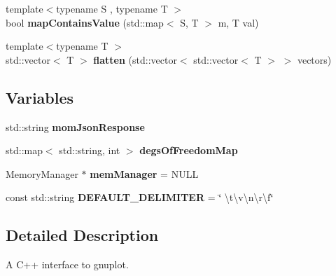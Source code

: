 \begin{DoxyCompactItemize}
\item 
{\footnotesize template$<$typename S , typename T $>$ }\\bool {\bfseries map\+Contains\+Value} (std\+::map$<$ S, T $>$ m, T val)\hypertarget{namespacekukadu_a31ae41f2729ca2c2be7f85acc9a875c1}{}\label{namespacekukadu_a31ae41f2729ca2c2be7f85acc9a875c1}

\item 
{\footnotesize template$<$typename T $>$ }\\std\+::vector$<$ T $>$ {\bfseries flatten} (std\+::vector$<$ std\+::vector$<$ T $>$ $>$ vectors)\hypertarget{namespacekukadu_a33dc3d9bd4c770753d96ce9abbab107e}{}\label{namespacekukadu_a33dc3d9bd4c770753d96ce9abbab107e}

\end{DoxyCompactItemize}
\subsection*{Variables}
\begin{DoxyCompactItemize}
\item 
std\+::string {\bfseries mom\+Json\+Response}\hypertarget{namespacekukadu_abb61c4204f8db773c0c983bf215313c0}{}\label{namespacekukadu_abb61c4204f8db773c0c983bf215313c0}

\item 
std\+::map$<$ std\+::string, int $>$ {\bfseries degs\+Of\+Freedom\+Map}\hypertarget{namespacekukadu_a74c6551366c28524eb14f644f9c80efd}{}\label{namespacekukadu_a74c6551366c28524eb14f644f9c80efd}

\item 
Memory\+Manager $\ast$ {\bfseries mem\+Manager} = N\+U\+LL\hypertarget{namespacekukadu_a3414c24f5ece06d1fca7fcd26091deda}{}\label{namespacekukadu_a3414c24f5ece06d1fca7fcd26091deda}

\item 
const std\+::string {\bfseries D\+E\+F\+A\+U\+L\+T\+\_\+\+D\+E\+L\+I\+M\+I\+T\+ER} = \char`\"{} \textbackslash{}t\textbackslash{}v\textbackslash{}n\textbackslash{}r\textbackslash{}f\char`\"{}\hypertarget{namespacekukadu_a627d5cc15a5c553b373f2e781bd4b338}{}\label{namespacekukadu_a627d5cc15a5c553b373f2e781bd4b338}

\end{DoxyCompactItemize}


\subsection{Detailed Description}
A C++ interface to gnuplot. 

